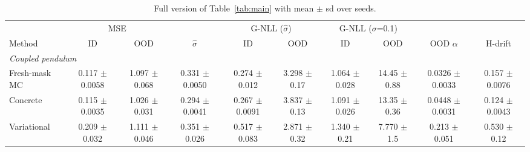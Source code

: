 \begin{table}[t]
\centering
\small
\setlength{\tabcolsep}{3pt}
\caption{Full version of Table~\ref{tab:main} with mean $\pm$ sd over seeds.}
\label{tab:main-full}
\begin{tabular}{lccccccccc}
\toprule
 & \multicolumn{2}{c}{MSE} &  & \multicolumn{2}{c}{G-NLL ($\hat\sigma$)} & \multicolumn{2}{c}{G-NLL ($\sigma$=0.1)} &  &  \\
\cmidrule(lr){2-3}
\cmidrule(lr){5-6}
\cmidrule(lr){7-8}
Method & ID & OOD & $\hat\sigma$ & ID & OOD & ID & OOD & OOD $\alpha$ & H-drift \\
\midrule
\multicolumn{10}{l}{\emph{Coupled pendulum}} \\
Fresh-mask MC & \makecell{0.117\\ {\footnotesize $\pm$ 0.0058}} & \makecell{1.097\\ {\footnotesize $\pm$ 0.068}} & \makecell{0.331\\ {\footnotesize $\pm$ 0.0050}} & \makecell{0.274\\ {\footnotesize $\pm$ 0.012}} & \makecell{3.298\\ {\footnotesize $\pm$ 0.17}} & \makecell{1.064\\ {\footnotesize $\pm$ 0.028}} & \makecell{14.45\\ {\footnotesize $\pm$ 0.88}} & \makecell{0.0326\\ {\footnotesize $\pm$ 0.0033}} & \makecell{0.157\\ {\footnotesize $\pm$ 0.0076}} \\
Concrete & \makecell{0.115\\ {\footnotesize $\pm$ 0.0035}} & \makecell{1.026\\ {\footnotesize $\pm$ 0.031}} & \makecell{0.294\\ {\footnotesize $\pm$ 0.0041}} & \makecell{0.267\\ {\footnotesize $\pm$ 0.0091}} & \makecell{3.837\\ {\footnotesize $\pm$ 0.13}} & \makecell{1.091\\ {\footnotesize $\pm$ 0.026}} & \makecell{13.35\\ {\footnotesize $\pm$ 0.36}} & \makecell{0.0448\\ {\footnotesize $\pm$ 0.0031}} & \makecell{0.124\\ {\footnotesize $\pm$ 0.0043}} \\
Variational & \makecell{0.209\\ {\footnotesize $\pm$ 0.032}} & \makecell{1.111\\ {\footnotesize $\pm$ 0.046}} & \makecell{0.351\\ {\footnotesize $\pm$ 0.026}} & \makecell{0.517\\ {\footnotesize $\pm$ 0.083}} & \makecell{2.871\\ {\footnotesize $\pm$ 0.32}} & \makecell{1.340\\ {\footnotesize $\pm$ 0.21}} & \makecell{7.770\\ {\footnotesize $\pm$ 1.5}} & \makecell{0.213\\ {\footnotesize $\pm$ 0.051}} & \makecell{0.530\\ {\footnotesize $\pm$ 0.12}} \\

\end{tabular}
\end{table}
